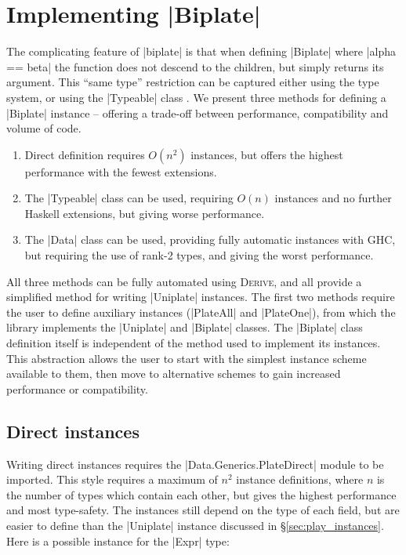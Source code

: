 \documentclass[preprint]{sigplanconf}
\let\cite=\citep
\newcommand{\derive}{\textsc{Derive}}
\newcommand{\ignore}{}
\begin{document}
\section{Implementing |Biplate|}
\label{sec:implement_playex}

The complicating feature of |biplate| is that when defining |Biplate| where \ignore|alpha == beta| the function does not descend to the children, but simply returns its argument. This ``same type'' restriction can be captured either using the type system, or using the |Typeable| class \cite{lammel:syb}. We present three methods for defining a |Biplate| instance -- offering a trade-off between performance, compatibility and volume of code.

\begin{enumerate}
\item Direct definition requires $O(n^2)$ instances, but offers the highest performance with the fewest extensions.
\item The |Typeable| class can be used, requiring $O(n)$ instances and no further Haskell extensions, but giving worse performance.
\item The |Data| class can be used, providing fully automatic instances with GHC, but requiring the use of rank-2 types, and giving the worst performance.
\end{enumerate}

All three methods can be fully automated using \derive{}, and all provide a simplified method for writing |Uniplate| instances. The first two methods require the user to define auxiliary instances (|PlateAll| and |PlateOne|), from which the library implements the |Uniplate| and |Biplate| classes. The |Biplate| class definition itself is independent of the method used to implement its instances. This abstraction allows the user to start with the simplest instance scheme available to them, then move to alternative schemes to gain increased performance or compatibility.


\subsection{Direct instances}
\label{sec:implement_playdirect}

Writing direct instances requires the |Data.Generics.PlateDirect| module to be imported. This style requires a maximum of $n^2$ instance definitions, where $n$ is the number of types which contain each other, but gives the highest performance and most type-safety. The instances still depend on the type of each field, but are easier to define than the |Uniplate| instance discussed in \S\ref{sec:play_instances}. Here is a possible instance for the |Expr| type:
\end{document}
